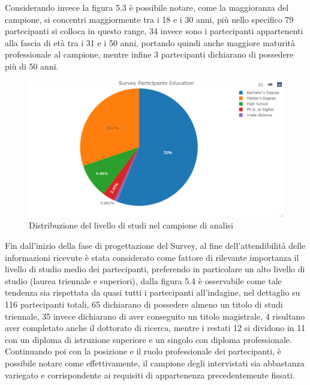    Considerando invece la figura 5.3 è possibile notare, come la maggioranza del campione, si concentri maggiormente tra i 18 e i 30 anni, più nello specifico 79 partecipanti si colloca in questo range, 34 invece sono i partecipanti appartenenti alla fascia di età tra i 31 e i 50 anni, portando quindi anche maggiore maturità professionale al campione, mentre infine 3 partecipanti dichiarano di possedere più di 50 anni.
   
   \begin{figure}[h!]
        \centering
        \includegraphics[width=1\textwidth]{figure/Analisi/Background/Survey_Partecipants_Education.png}
        \caption{Distribuzione del livello di studi nel campione di analisi}
    \end{figure}
   Fin dall'inizio della fase di progettazione del Survey, al fine dell'attendibilità delle informazioni ricevute è stata considerato come fattore di rilevante importanza il livello di studio medio dei partecipanti, preferendo in particolare un alto livello di studio (laurea triennale e superiori), dalla figura 5.4 è osservabile come tale tendenza sia rispettata da quasi tutti i partecipanti all'indagine, nel dettaglio su 116 partecipanti totali, 65 dichiarano di possedere almeno un titolo di studi triennale, 35 invece dichiarano di aver conseguito un titolo magistrale, 4 risultano aver completato anche il dottorato di ricerca, mentre i restati 12 si dividono in 11 con un diploma di istruzione superiore e un singolo con diploma professionale.\\
   
   Continuando poi con la posizione e il ruolo professionale dei partecipanti, è possibile notare come effettivamente, il campione degli intervistati sia abbastanza variegato e corrispondente ai requisiti di appartenenza precedentemente fissati. 
   
